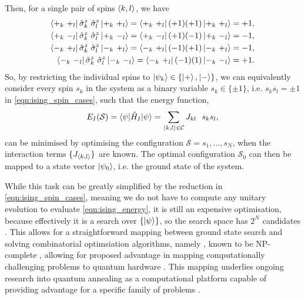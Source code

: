 Then, for a single pair of spins ${ \langle k, l \rangle }$, we have
\begin{equation}
    \label{eqn:ising_spin_cases}
    \begin{split}
        \bra{+_{k} \ +_{l} } \hat{\sigma}^{z}_{k} \ \hat{\sigma}^z_{l}  \ket{+_{k} \ +_{l} } =  \bra{+_{k} \ +_{l} } (+1)(+1) \ket{+_{k} \ +_{l} } = +1, \\
        \bra{+_{k} \ -_{l} } \hat{\sigma}^{z}_{k} \ \hat{\sigma}^z_{l} \ket{+_{k} \ -_{l} } = \bra{+_{k} \ -_{l} } (+1)(-1) \ket{+_{k} \ -_{l} } = -1 , \\
        \bra{-_{k} \ +_{l} } \hat{\sigma}^{z}_{k} \ \hat{\sigma}^z_{l} \ket{-_{k} \ +_{l} } = \bra{-_{k} \ +_{l} } (-1)(+1) \ket{-_{k} \ +_{l} } = -1, \\
        \bra{-_{k} \ -_{l} } \hat{\sigma}^{z}_{k} \ \hat{\sigma}^z_{l} \ket{-_{k} \ -_{l} } = \bra{-_{k} \ +_{l} } (-1)(1) \ket{-_{k} \ -_{l} } = +1. \\
    \end{split}
\end{equation}
So, by restricting the individual spins to $\ket{\psi_k} \in \{\ket{+}, \ket{-}\}$, 
    we can equivalently consider every spin $s_k$ in the system
    as a binary variable $s_k \in \{\pm 1\}$,
    i.e. $s_k s_l = \pm 1$ in \cref{eqn:ising_spin_cases},
    such that the energy function,
\begin{equation}
    \label{eqn:ising_energy}
    E_I(\mathcal{S}) = \braket{ \psi | \hat{H}_I | \psi } = \sum\limits_{{ \langle k, l \rangle } \in { \mathcal{C}}} J_{kl} \ \ s_k s_l,
\end{equation}
    can be minimised by optimising the configuration $\mathcal{S} = s_1, \dots, s_N$, when the interaction terms $\{J_{{ \langle k, l \rangle }}\}$ are known.
The optimal configuration $\mathcal{S}_0$ can then be mapped to a 
    state vector $\ket{\psi_0}$, i.e. the ground state of the system. 
\par 

While this task can be greatly simplified by the reduction in \cref{eqn:ising_spin_cases}, 
    meaning we do not have to compute any unitary evolution to evaluate \cref{eqn:ising_energy},
    it is still an expensive optimisation, because effectively it is a search over $\{ \ket{\psi }\}$, 
    so the search space has $2^N$ candidates \cite{onsager1944crystal, barahona1982computational}. 
This allows for a straightforward mapping between ground state search 
    and solving combinatorial optimsiation algorithms, namely , 
    known to be NP-complete \cite{garey1979computers}, 
    allowing for proposed advantage in mapping computationally challenging problems to quantum hardware \cite{lucas2014ising}. 
This mapping underlies ongoing research into quantum annealing as a computational platform capable of providing 
    advantage for a specific family of problems \cite{santoro2006optimization, bapst2013quantum, johnson2011quantum}. 
\par

